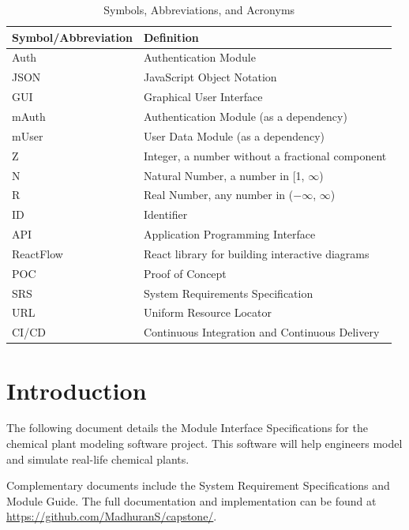 \documentclass[12pt, titlepage]{article}
\begin{document}
\begin{table}[h!]
\centering
\begin{tabular}{|l|l|}
\hline
\textbf{Symbol/Abbreviation} & \textbf{Definition} \\ \hline
Auth & Authentication Module \\ \hline
JSON & JavaScript Object Notation \\ \hline
GUI & Graphical User Interface \\ \hline
mAuth & Authentication Module (as a dependency) \\ \hline
mUser & User Data Module (as a dependency) \\ \hline
Z & Integer, a number without a fractional component \\ \hline
N & Natural Number, a number in [1, $\infty$) \\ \hline
R & Real Number, any number in ($-\infty$, $\infty$) \\ \hline
ID & Identifier \\ \hline
API & Application Programming Interface \\ \hline
ReactFlow & React library for building interactive diagrams \\ \hline
POC & Proof of Concept \\ \hline
SRS & System Requirements Specification \\ \hline
URL & Uniform Resource Locator \\ \hline
CI/CD & Continuous Integration and Continuous Delivery \\ \hline
\end{tabular}
\caption{Symbols, Abbreviations, and Acronyms}
\label{table:abbreviations}
\end{table}


\newpage

\tableofcontents

\newpage


\section{Introduction}

The following document details the Module Interface Specifications for the chemical plant modeling software project. This software will help engineers model and simulate real-life chemical plants.

Complementary documents include the System Requirement Specifications
and Module Guide.  The full documentation and implementation can be
found at \url{https://github.com/MadhuranS/capstone/}.  
\end{document}
